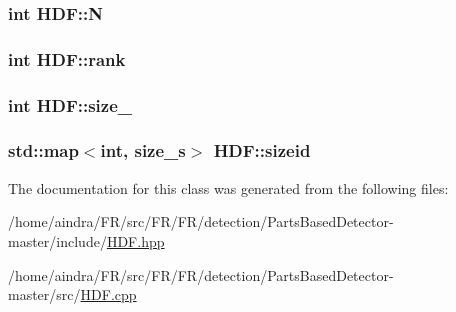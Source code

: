 \hypertarget{classHDF_ab3b5c9aa5d584ac3aa16ee9c6d04c340}{
\subsubsection[{\-N}]{\setlength{\rightskip}{0pt plus 5cm}int {\bf \-H\-D\-F\-::\-N}}}\label{classHDF_ab3b5c9aa5d584ac3aa16ee9c6d04c340}
\hypertarget{classHDF_ad8673b6d5dacddd59fcb8c10682160f7}{
\subsubsection[{rank}]{\setlength{\rightskip}{0pt plus 5cm}int {\bf \-H\-D\-F\-::rank}}}\label{classHDF_ad8673b6d5dacddd59fcb8c10682160f7}
\hypertarget{classHDF_a4b0ee3e98c89b373052525bb5abd8fae}{
\subsubsection[{size\-\_\-}]{\setlength{\rightskip}{0pt plus 5cm}int {\bf \-H\-D\-F\-::size\-\_\-}}}\label{classHDF_a4b0ee3e98c89b373052525bb5abd8fae}
\hypertarget{classHDF_ab47d2b1f7a374429d26ec54f15f4cea5}{
\subsubsection[{sizeid}]{\setlength{\rightskip}{0pt plus 5cm}std\-::map$<$int, {\bf size\-\_\-s}$>$ {\bf \-H\-D\-F\-::sizeid}}}\label{classHDF_ab47d2b1f7a374429d26ec54f15f4cea5}


\-The documentation for this class was generated from the following files\-:\begin{DoxyCompactItemize}
\item 
/home/aindra/\-F\-R/src/\-F\-R/\-F\-R/detection/\-Parts\-Based\-Detector-\/master/include/\hyperlink{HDF_8hpp}{\-H\-D\-F.\-hpp}\item 
/home/aindra/\-F\-R/src/\-F\-R/\-F\-R/detection/\-Parts\-Based\-Detector-\/master/src/\hyperlink{HDF_8cpp}{\-H\-D\-F.\-cpp}\end{DoxyCompactItemize}
